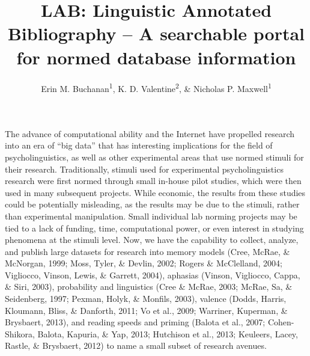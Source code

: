 \documentclass[english,man]{apa6}
\title{LAB: Linguistic Annotated Bibliography -- A searchable portal for normed
database information}
\author{Erin M. Buchanan\textsuperscript{1}, K. D. Valentine\textsuperscript{2}, \& Nicholas P. Maxwell\textsuperscript{1}}
\affiliation{
    \vspace{0.5cm}
          \textsuperscript{1} Missouri State University\\
          \textsuperscript{2} University of Missouri  }
\theoremstyle{definition}
\theoremstyle{definition}
\theoremstyle{definition}
\theoremstyle{remark}
\begin{document}
\maketitle

\setcounter{secnumdepth}{0}



The advance of computational ability and the Internet have propelled
research into an era of \enquote{big data} that has interesting
implications for the field of psycholinguistics, as well as other
experimental areas that use normed stimuli for their research.
Traditionally, stimuli used for experimental psycholinguistics research
were first normed through small in-house pilot studies, which were then
used in many subsequent projects. While economic, the results from these
studies could be potentially misleading, as the results may be due to
the stimuli, rather than experimental manipulation. Small individual lab
norming projects may be tied to a lack of funding, time, computational
power, or even interest in studying phenomena at the stimuli level. Now,
we have the capability to collect, analyze, and publish large datasets
for research into memory models (Cree, McRae, \& McNorgan, 1999; Moss,
Tyler, \& Devlin, 2002; Rogers \& McClelland, 2004; Vigliocco, Vinson,
Lewis, \& Garrett, 2004), aphasias (Vinson, Vigliocco, Cappa, \& Siri,
2003), probability and linguistics (Cree \& McRae, 2003; McRae, Sa, \&
Seidenberg, 1997; Pexman, Holyk, \& Monfils, 2003), valence (Dodds,
Harris, Kloumann, Bliss, \& Danforth, 2011; Vo et al., 2009; Warriner,
Kuperman, \& Brysbaert, 2013), and reading speeds and priming (Balota et
al., 2007; Cohen-Shikora, Balota, Kapuria, \& Yap, 2013; Hutchison et
al., 2013; Keuleers, Lacey, Rastle, \& Brysbaert, 2012) to name a small
subset of research avenues.
\end{document}
